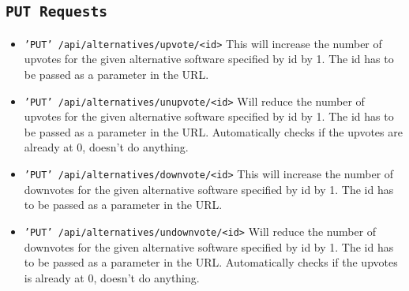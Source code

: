 \subsection{\texttt{PUT Requests}}

\begin{itemize}

\item{\texttt{'PUT' /api/alternatives/upvote/<id>}}
This will increase the number of upvotes for the given alternative software specified by id by 1. The id has to be passed as a parameter in the URL.


\item{\texttt{'PUT' /api/alternatives/unupvote/<id>}}
Will reduce the number of upvotes for the given alternative software specified by id by 1. The id has to be passed as a parameter in the URL. Automatically checks if the upvotes are already at 0, doesn’t do anything.


\item{\texttt{'PUT' /api/alternatives/downvote/<id>}}
This will increase the number of downvotes for the given alternative software specified by id by 1. The id has to be passed as a parameter in the URL.


\item{\texttt{'PUT' /api/alternatives/undownvote/<id>}}
Will reduce the number of downvotes for the given alternative software specified by id by 1. The id has to be passed as a parameter in the URL. Automatically checks if the upvotes is already at 0, doesn’t do anything.

\end{itemize}























